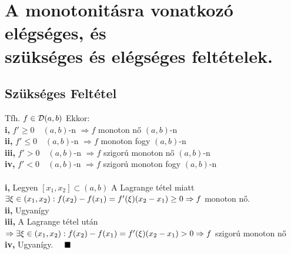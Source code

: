 \documentclass[a4paper,12pt]{article}
\begin{document}
\section{A monotonitásra vonatkozó elégséges, és \\ szükséges és elégséges feltételek.}
\subsection{Szükséges Feltétel}
\tetel Tfh. $f\in \displaystyle\mathcal{D}(a,b)$ Ekkor: \\[0.1cm]\hspace*{0.3cm}\textbf{i,} $f'\geq0\quad(a,b)$-n
$\Rightarrow f$ monoton nő $(a,b)$-n\\[0.1cm]\hspace*{0.3cm}\textbf{ii,}
$f'\leq0\quad(a,b)$-n $\Rightarrow f$ monoton fogy $(a,b)$-n\\[0.1cm]
\hspace*{0.3cm}\textbf{iii,} $f'>0\quad (a,b)$-n $\Rightarrow f$ szigorú monoton nő
$(a,b)$-n\\[0.1cm]\hspace*{0.3cm}\textbf{iv,} $f'<0\quad (a,b)$-n $\Rightarrow f$
szigorú monoton fogy $(a,b)$-n\\[0.2cm]\biz \\[0.1cm]\textbf{i,} Legyen
$[x_1,x_2]\subset(a,b)$ A Lagrange tétel miatt $\exists\xi\in
(x_1,x_2):\\[0.2cm]f(x_2)-f(x_1)=f'(\xi)(x_2-x_1)\geq0\Rightarrow f$ monoton
nő.\\[0.1cm]\textbf{ii,} Ugyanígy\\[0.1cm]\textbf{iii,} A Lagrange tétel után
$\Rightarrow\exists\xi\in (x_1,x_2):\\[0.2cm]f(x_2)-f(x_1)=f'(\xi)(x_2-x_1)>0
\Rightarrow f$ szigorú monoton nő\\[0.1cm]\textbf{iv,} Ugyanígy. $\quad\blacksquare$
\end{document}
